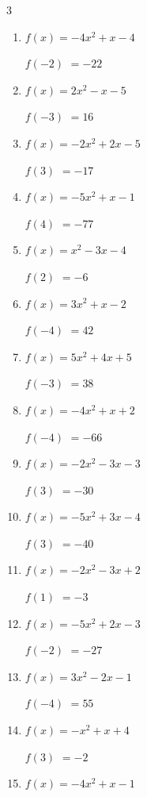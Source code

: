 \begin{multicols}{3}
\begin{enumerate}
$f(5)$
        $= 106$

\columnbreak %

\resetques

  \item $f(x)=-4x^{2}+x-4$

$f(-2)$
        $= -22$

  \item $f(x)=2x^{2}-x-5$

$f(-3)$
        $= 16$

  \item $f(x)=-2x^{2}+2x-5$

$f(3)$
        $= -17$

  \item $f(x)=-5x^{2}+x-1$

$f(4)$
        $= -77$

  \item $f(x)=x^{2}-3x-4$

$f(2)$
        $= -6$

  \item $f(x)=3x^{2}+x-2$

$f(-4)$
        $= 42$

  \item $f(x)=5x^{2}+4x+5$

$f(-3)$
        $= 38$

  \item $f(x)=-4x^{2}+x+2$

$f(-4)$
        $= -66$

  \item $f(x)=-2x^{2}-3x-3$

$f(3)$
        $= -30$

  \item $f(x)=-5x^{2}+3x-4$

$f(3)$
        $= -40$

  \item $f(x)=-2x^{2}-3x+2$

$f(1)$
        $= -3$

  \item $f(x)=-5x^{2}+2x-3$

$f(-2)$
        $= -27$

  \item $f(x)=3x^{2}-2x-1$

$f(-4)$
        $= 55$

  \item $f(x)=-x^{2}+x+4$

$f(3)$
        $= -2$

  \item $f(x)=-4x^{2}+x-1$


\end{enumerate}
\end{multicols}
